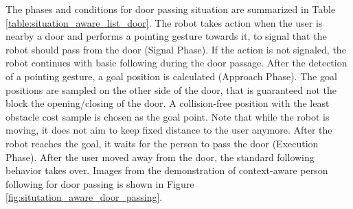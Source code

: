 \documentclass[3p]{elsarticle}
\begin{document}
The phases and conditions for door passing situation are summarized in Table \ref{table:situation_aware_list_door}. The robot takes action when the user is nearby a door and performs a pointing gesture towards it, to signal that the robot should pass from the door (Signal Phase). If the action is not signaled, the robot continues with basic following during the door passage. After the detection of a pointing gesture, a goal position is calculated (Approach Phase). The goal positions are sampled on the other side of the door, that is guaranteed not the block the opening/closing of the door. A collision-free position with the least obstacle cost sample is chosen as the goal point. Note that while the robot is moving, it does not aim to keep fixed distance to the user anymore. After the robot reaches the goal, it waits for the person to pass the door (Execution Phase). After the user moved away from the door, the standard following behavior takes over. Images from the demonstration of context-aware person following for door passing is shown in Figure \ref{fig:situtation_aware_door_passing}.
\end{document}
